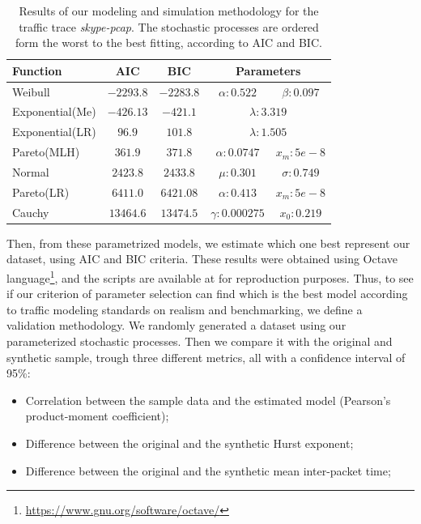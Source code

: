 \begin{table}[t]
\centering
\caption{Results of our modeling and simulation methodology for the traffic trace \textit{skype-pcap}. The stochastic processes are ordered form the worst to the best fitting, according to AIC and BIC.}
\label{tab:skype-results}
\begin{tabular}{lcccc}
\hline
Function        & AIC         & BIC        & \multicolumn{2}{c}{Parameters}      \\ \hline
Weibull         & $-2293.8$   & $-2283.8$ & $\alpha:0.522$ & $\beta:0.097$  \\
Exponential(Me) & $-426.13$   & $-421.1$  & \multicolumn{2}{c}{$\lambda:3.319$}  \\
Exponential(LR) & $96.9$   & $101.8$  & \multicolumn{2}{c}{$\lambda:1.505$}         \\
Pareto(MLH)     & $361.9$   & $371.8$  & $\alpha:0.0747$ & $x_m:5e-8$       \\
Normal          & $2423.8$    & $2433.8$   & $\mu:0.301 $   & $\sigma:0.749$ \\
Pareto(LR)      & $6411.0$   & $6421.08$  & $\alpha:0.413$ & $x_m:5e-8$       \\
Cauchy          & $13464.6$    & $13474.5$   & $\gamma:0.000275$ & $x_0:0.219$    \\ \hline
\end{tabular}
\end{table}

Then, from these parametrized models, we estimate which one best represent our dataset, using AIC  and BIC criteria. These results were obtained using Octave language\footnote{ \href{https://www.gnu.org/software/octave/}{https://www.gnu.org/software/octave/}}, and the scripts are available at \cite{projeto-github} for reproduction purposes. Thus, to see if our criterion of parameter selection can find which is the best model according to traffic modeling standards on realism and benchmarking\cite{validate-trafficgen}, we define a validation methodology. We randomly generated a dataset using our parameterized stochastic processes.  Then we compare it with the original and synthetic sample, trough three different metrics, all with a confidence interval of 95\%:

\begin{itemize}
\item Correlation between the sample data and the estimated model (Pearson's product-moment coefficient);
\item Difference between the original and the synthetic Hurst exponent;
\item Difference between the original and the synthetic mean inter-packet time;
\end{itemize}

